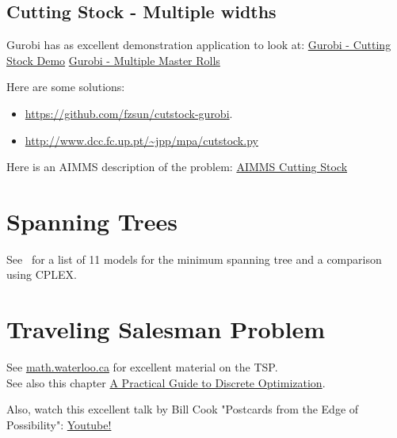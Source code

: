 \subsection{Cutting Stock - Multiple widths}
\begin{resource}
Gurobi has as excellent demonstration application to look at:
\href{https://demos.gurobi.com/cutstock/}{Gurobi - Cutting Stock Demo}
\href{https://www.gurobi.com/cutting-stock-problem-with-multiple-master-rolls/}{Gurobi - Multiple Master Rolls}
\end{resource}


Here are some solutions:
\begin{itemize}
\item  \url{https://github.com/fzsun/cutstock-gurobi}.
\item \url{http://www.dcc.fc.up.pt/~jpp/mpa/cutstock.py}
\end{itemize}


Here is an AIMMS description of the problem: 
\href{https://download.aimms.com/aimms/download/manuals/AIMMS3OM_CuttingStock.pdf}{AIMMS Cutting Stock}



\section{Spanning Trees}
\label{sec:spanning-tree-models}

%
%
%
%
\begin{resource}
See~\cite{Abdelmaguid2018} for a list of 11 models for the minimum spanning tree and a comparison using CPLEX.
\end{resource}

\section{Traveling Salesman Problem}
\label{sec:tsp-models}
\begin{resource}
See \href{http://www.math.uwaterloo.ca/tsp/index.html}{math.waterloo.ca} for excellent material on the TSP.\\
See also this chapter \href{https://www.math.uwaterloo.ca/~bico/papers/comp_chapter1.pdf}{A Practical Guide to Discrete
Optimization}.

Also, watch this excellent talk by Bill Cook "Postcards from the Edge of Possibility":
\href{https://m.youtube.com/watch?v=5VjphFYQKj8}{Youtube!}
\end{resource}


